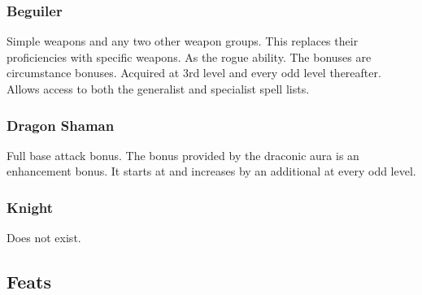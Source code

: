\subsubsection{Beguiler}
 Simple weapons and any two other weapon groups. This replaces their proficiencies with specific weapons.
 As the rogue ability.
 The bonuses are circumstance bonuses.
 Acquired at 3rd level and every odd level thereafter. Allows access to both the generalist and specialist spell lists.
\subsubsection{Dragon Shaman}
 Full base attack bonus.
 The bonus provided by the draconic aura is an enhancement bonus. It starts at  and increases by an additional  at every odd level.
\subsubsection{Knight}
Does not exist.
\subsection{Feats}
